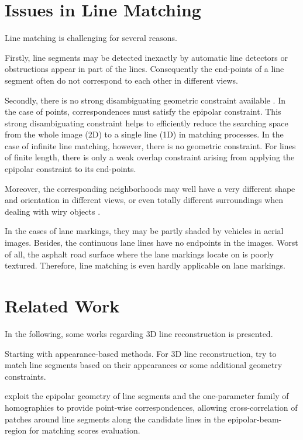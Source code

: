 \section{Issues in Line Matching}

Line matching is challenging for several reasons.

Firstly, line segments may be detected inexactly by automatic line detectors or obstructions appear in part of the lines. Consequently the end-points of a line segment often do not correspond to each other in different views.

Secondly, there is no strong disambiguating geometric constraint available \cite{SchmidJun1997}. In the case of points, correspondences must satisfy the epipolar constraint. This strong disambiguating constraint helps to efficiently reduce the searching space from the whole image (2D) to a single line (1D) in matching processes. In the case of infinite line matching, however, there is no geometric constraint. For lines of finite length, there is only a weak overlap constraint arising from applying the epipolar constraint to its end-points.

Moreover, the corresponding neighborhoods may well have a very different shape and orientation in different views, or even totally different surroundings when dealing with wiry objects \cite{HoferFeb2013}.

In the cases of lane markings, they may be partly shaded by vehicles in aerial images. Besides, the continuous lane lines have no endpoints in the images. Worst of all, the asphalt road surface where the lane markings locate on is poorly textured. Therefore, line matching is even hardly applicable on lane markings.

\section{Related Work}
In the following, some works regarding 3D line reconstruction is presented.

Starting with appearance-based methods. For 3D line reconstruction, \cite{SchmidJun1997,BayJun2005,WangMay2009} try to match line segments based on their appearances or some additional geometry constraints.

\citeauthor{SchmidJun1997} exploit the epipolar geometry of line segments and the one-parameter family of homographies to provide point-wise correspondences, allowing cross-correlation of patches around line segments along the candidate lines in the epipolar-beam-region for matching scores evaluation.

